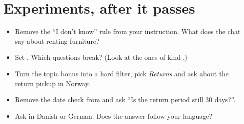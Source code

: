 \documentclass[11pt]{article}
\begin{document}
\section{Experiments, after it passes}

\begin{itemize}[leftmargin=1.4em, itemsep=3pt]
\item Remove the ``I don't know'' rule from your instruction. What does
  the chat say about renting furniture?
\item Set . Which questions break? (Look at the ones of kind
  .)
\item Turn the topic bonus into a hard filter, pick \emph{Returns} and
  ask about the return pickup in Norway.
\item Remove the date check from  and ask ``Is the
  return period still 30 days?''.
\item Ask in Danish or German. Does the answer follow your language?
\end{itemize}
\end{document}
